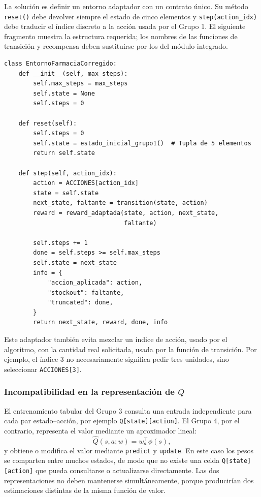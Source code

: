 \documentclass[11pt,letterpaper]{article}
\begin{document}
La solución es definir un entorno adaptador con un contrato único. Su método
\texttt{reset()} debe devolver siempre el estado de cinco elementos y
\texttt{step(action\_idx)} debe traducir el índice discreto a la acción usada por
el Grupo 1. El siguiente fragmento muestra la estructura requerida; los nombres de
las funciones de transición y recompensa deben sustituirse por los del módulo
integrado.

\begin{lstlisting}[caption={Adaptador entre el entrenamiento y la dinámica del Grupo 1}]
class EntornoFarmaciaCorregido:
    def __init__(self, max_steps):
        self.max_steps = max_steps
        self.state = None
        self.steps = 0

    def reset(self):
        self.steps = 0
        self.state = estado_inicial_grupo1()  # Tupla de 5 elementos
        return self.state

    def step(self, action_idx):
        action = ACCIONES[action_idx]
        state = self.state
        next_state, faltante = transition(state, action)
        reward = reward_adaptada(state, action, next_state,
                                 faltante)

        self.steps += 1
        done = self.steps >= self.max_steps
        self.state = next_state
        info = {
            "accion_aplicada": action,
            "stockout": faltante,
            "truncated": done,
        }
        return next_state, reward, done, info
\end{lstlisting}

Este adaptador también evita mezclar un índice de acción, usado por el algoritmo,
con la cantidad real solicitada, usada por la función de transición. Por ejemplo,
el índice 3 no necesariamente significa pedir tres unidades, sino seleccionar
\texttt{ACCIONES[3]}.

\subsubsection*{Incompatibilidad en la representación de $Q$}

El entrenamiento tabular del Grupo 3 consulta una entrada independiente para cada
par estado--acción, por ejemplo \texttt{Q[state][action]}. El Grupo 4, por el
contrario, representa el valor mediante un aproximador lineal:
\[
  \widehat Q(s,a;w)=w_a^{\top}\phi(s),
\]
y obtiene o modifica el valor mediante \texttt{predict} y \texttt{update}. En este
caso los pesos se comparten entre muchos estados, de modo que no existe una celda
\texttt{Q[state][action]} que pueda consultarse o actualizarse directamente. Las
dos representaciones no deben mantenerse simultáneamente, porque producirían dos
estimaciones distintas de la misma función de valor.
\end{document}
